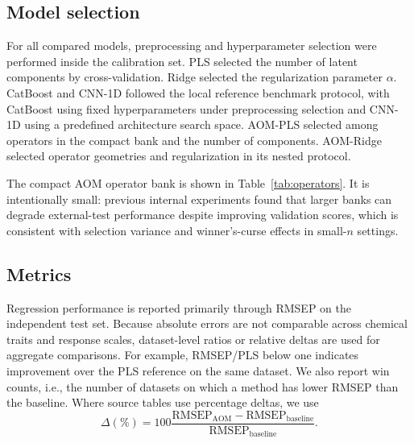 \documentclass[11pt,a4paper]{article}
\begin{document}
\begin{table}[t]
  \centering
  \caption{Benchmark diversity and external-validation design.  The headline
  AOM-PLS and AOM-Ridge claims use different finalized subsets; the table
  reports the corresponding denominators and the broader regression-corpus
  ranges used to characterize heterogeneity.}
  \label{tab:benchmark_diversity}
  \small
  
\end{table}

\subsection{Model selection}

For all compared models, preprocessing and hyperparameter selection were
performed inside the calibration set.  PLS selected the number of latent
components by cross-validation.  Ridge selected the regularization parameter
$\alpha$.  CatBoost and CNN-1D followed the local reference benchmark protocol,
with CatBoost using fixed hyperparameters under preprocessing selection and
CNN-1D using a predefined architecture search space.  AOM-PLS selected among
operators in the compact bank and the number of components.  AOM-Ridge selected
operator geometries and regularization in its nested protocol.

The compact AOM operator bank is shown in Table~\ref{tab:operators}.  It is
intentionally small: previous internal experiments found that larger banks can
degrade external-test performance despite improving validation scores, which is
consistent with selection variance and winner's-curse effects in small-$n$
settings.

\begin{table}[t]
  \centering
  \caption{Compact operator bank and branch preprocessing distinction.}
  \label{tab:operators}
  \small
  
\end{table}

\subsection{Metrics}

Regression performance is reported primarily through RMSEP on the independent
test set.  Because absolute errors are not comparable across chemical traits
and response scales, dataset-level ratios or relative deltas are used for
aggregate comparisons.  For example, RMSEP/PLS below one indicates improvement
over the PLS reference on the same dataset.  We also report win counts, i.e.,
the number of datasets on which a method has lower RMSEP than the baseline.
Where source tables use percentage deltas, we use
\begin{equation}
  \Delta(\%) = 100 \frac{\mathrm{RMSEP}_{\mathrm{AOM}} -
  \mathrm{RMSEP}_{\mathrm{baseline}}}{\mathrm{RMSEP}_{\mathrm{baseline}}}.
\end{equation}
\end{document}
